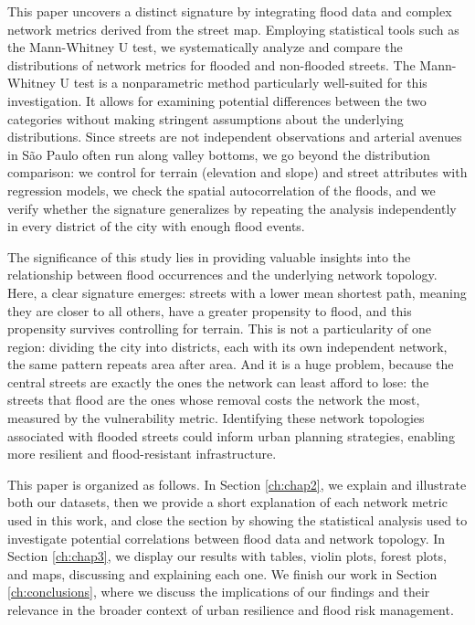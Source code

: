 \documentclass[sn-nature]{sn-jnl}%
\theoremstyle{thmstyleone}%
\theoremstyle{thmstyletwo}%
\theoremstyle{thmstylethree}%
\begin{document}
This paper uncovers a distinct signature by integrating flood data and complex network metrics derived from the street map.
Employing statistical tools such as the Mann-Whitney U test, we systematically analyze and compare the distributions of network metrics for flooded and non-flooded streets.
The Mann-Whitney U test is a nonparametric method particularly well-suited for this investigation. It allows for examining potential differences between the two categories without making stringent assumptions about the underlying distributions.
Since streets are not independent observations and arterial avenues in São Paulo often run along valley bottoms, we go beyond the distribution comparison: we control for terrain (elevation and slope) and street attributes with regression models, we check the spatial autocorrelation of the floods, and we verify whether the signature generalizes by repeating the analysis independently in every district of the city with enough flood events.

The significance of this study lies in providing valuable insights into the relationship between flood occurrences and the underlying network topology. Here, a clear signature emerges: streets with a lower mean shortest path, meaning they are closer to all others, have a greater propensity to flood, and this propensity survives controlling for terrain. This is not a particularity of one region: dividing the city into districts, each with its own independent network, the same pattern repeats area after area. And it is a huge problem, because the central streets are exactly the ones the network can least afford to lose: the streets that flood are the ones whose removal costs the network the most, measured by the vulnerability metric.
Identifying these network topologies associated with flooded streets could inform urban planning strategies, enabling more resilient and flood-resistant infrastructure.


This paper is organized as follows. In Section \ref{ch:chap2}, we explain and illustrate both our datasets, then we provide a short explanation of each network metric used in this work, and close the section by showing the statistical analysis used to investigate potential correlations between flood data and network topology. In Section \ref{ch:chap3}, we display our results with tables, violin plots, forest plots, and maps, discussing and explaining each one. We finish our work in Section \ref{ch:conclusions}, where we discuss the implications of our findings and their relevance in the broader context of urban resilience and flood risk management.
\end{document}
